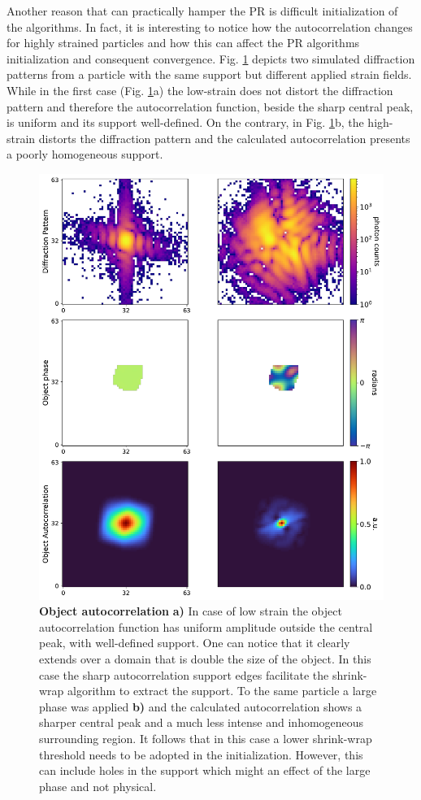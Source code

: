 Another reason that can practically hamper the PR is difficult initialization of the algorithms. In fact, it is 
interesting to notice how the autocorrelation changes for highly strained particles and
how this can affect the PR algorithms initialization and consequent convergence. Fig. \ref{fig:autocorr}
depicts two simulated diffraction patterns from a particle with the same support but different applied strain fields. 
While in the first case (Fig. \ref{fig:autocorr}a) the low-strain does not distort the diffraction pattern and therefore the autocorrelation 
function, beside the sharp central peak, is uniform and its support well-defined. On the contrary, in Fig. \ref{fig:autocorr}b, 
the high-strain distorts the diffraction pattern and the calculated autocorrelation presents a poorly homogeneous support. 

\begin{figure}[H]
    \centering
    \includegraphics[width=.7\textwidth]{figures/Intro/autocorr.pdf}
    \caption{\textbf{Object autocorrelation} \textbf{a)} In case of low strain the object autocorrelation function has 
    uniform amplitude outside the central peak, with well-defined support. One can notice that it clearly extends over a domain 
    that is double the size of the object. 
    In this case the sharp autocorrelation support edges facilitate the shrink-wrap algorithm to extract the support. 
    To the same particle a large phase was applied \textbf{b)} and the calculated autocorrelation shows a 
    sharper central peak and a much less intense and inhomogeneous surrounding region.
    It follows that in this case a lower shrink-wrap threshold needs to be adopted in the initialization. However, this can 
    include holes in the support which might an effect of the large phase and not physical. }
    \label{fig:autocorr}
\end{figure}

